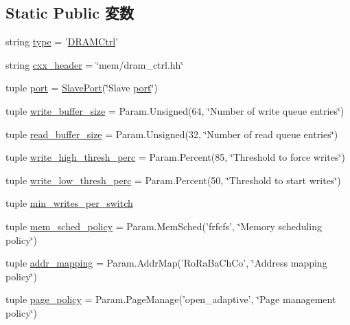 \subsection*{Static Public 変数}
\begin{DoxyCompactItemize}
\item 
string \hyperlink{classDRAMCtrl_1_1DRAMCtrl_acce15679d830831b0bbe8ebc2a60b2ca}{type} = '\hyperlink{classDRAMCtrl_1_1DRAMCtrl}{DRAMCtrl}'
\item 
string \hyperlink{classDRAMCtrl_1_1DRAMCtrl_a17da7064bc5c518791f0c891eff05fda}{cxx\_\-header} = \char`\"{}mem/dram\_\-ctrl.hh\char`\"{}
\item 
tuple \hyperlink{classDRAMCtrl_1_1DRAMCtrl_a1aadf525515ecfcf662c2aa51a503763}{port} = \hyperlink{classSlavePort}{SlavePort}(\char`\"{}Slave \hyperlink{classDRAMCtrl_1_1DRAMCtrl_a1aadf525515ecfcf662c2aa51a503763}{port}\char`\"{})
\item 
tuple \hyperlink{classDRAMCtrl_1_1DRAMCtrl_afcd1312043c865c85b8db72167b6eccf}{write\_\-buffer\_\-size} = Param.Unsigned(64, \char`\"{}Number of write queue entries\char`\"{})
\item 
tuple \hyperlink{classDRAMCtrl_1_1DRAMCtrl_a5565530152f22fcf573df39bc15f2cbb}{read\_\-buffer\_\-size} = Param.Unsigned(32, \char`\"{}Number of read queue entries\char`\"{})
\item 
tuple \hyperlink{classDRAMCtrl_1_1DRAMCtrl_a085a7db2cf6b40fb8b91f5a312776d99}{write\_\-high\_\-thresh\_\-perc} = Param.Percent(85, \char`\"{}Threshold to force writes\char`\"{})
\item 
tuple \hyperlink{classDRAMCtrl_1_1DRAMCtrl_a214c964ae36e59109324212f7136d419}{write\_\-low\_\-thresh\_\-perc} = Param.Percent(50, \char`\"{}Threshold to start writes\char`\"{})
\item 
tuple \hyperlink{classDRAMCtrl_1_1DRAMCtrl_aae741e23886d2d87de163d08ce065b7a}{min\_\-writes\_\-per\_\-switch}
\item 
tuple \hyperlink{classDRAMCtrl_1_1DRAMCtrl_ae14f8bbae75800115807fdeb5540a8ef}{mem\_\-sched\_\-policy} = Param.MemSched('frfcfs', \char`\"{}Memory scheduling policy\char`\"{})
\item 
tuple \hyperlink{classDRAMCtrl_1_1DRAMCtrl_a35512ed731b19b2eacfae921a3c159e0}{addr\_\-mapping} = Param.AddrMap('RoRaBaChCo', \char`\"{}Address mapping policy\char`\"{})
\item 
tuple \hyperlink{classDRAMCtrl_1_1DRAMCtrl_acdcd49cb93b86bb634e7f962e22cff9e}{page\_\-policy} = Param.PageManage('open\_\-adaptive', \char`\"{}Page management policy\char`\"{})

\end{DoxyCompactItemize}
